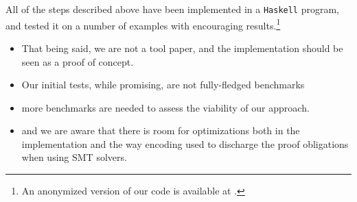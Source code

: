 All of the steps described above have been implemented in a \texttt{Haskell}
program, and tested it on a number of examples with encouraging
results.\footnote{An anonymized version of our code is available at
\repositoryUrl.}

\begin{itemize}
\item That being said, we are not a tool paper, and the implementation should
  be seen as a proof of concept.

\item Our initial tests, while promising, are not fully-fledged benchmarks

\item more benchmarks are needed to assess the viability of our approach.

\item and we are aware that there is room for 
optimizations both in the implementation and the way encoding used
to discharge the proof obligations when using SMT solvers.

\end{itemize}

